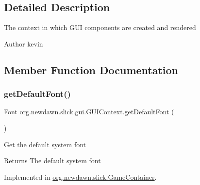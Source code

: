 \subsection{Detailed Description}
The context in which G\+UI components are created and rendered

\begin{DoxyAuthor}{Author}
kevin 
\end{DoxyAuthor}


\subsection{Member Function Documentation}
\mbox{\label{interfaceorg_1_1newdawn_1_1slick_1_1gui_1_1_g_u_i_context_a85b319f98e2881a0236edfe0dcdf71af}} 
\subsubsection{\texorpdfstring{get\+Default\+Font()}{getDefaultFont()}}
{\footnotesize\ttfamily \mbox{\hyperlink{interfaceorg_1_1newdawn_1_1slick_1_1_font}{Font}} org.\+newdawn.\+slick.\+gui.\+G\+U\+I\+Context.\+get\+Default\+Font (\begin{DoxyParamCaption}{ }\end{DoxyParamCaption})}

Get the default system font

\begin{DoxyReturn}{Returns}
The default system font 
\end{DoxyReturn}


Implemented in \mbox{\hyperlink{classorg_1_1newdawn_1_1slick_1_1_game_container_ab1e394eedde686708f3083869b45cf5d}{org.\+newdawn.\+slick.\+Game\+Container}}.

\mbox{\label{interfaceorg_1_1newdawn_1_1slick_1_1gui_1_1_g_u_i_context_a6370bee8e5833f95e27724b6a533c211}} 
